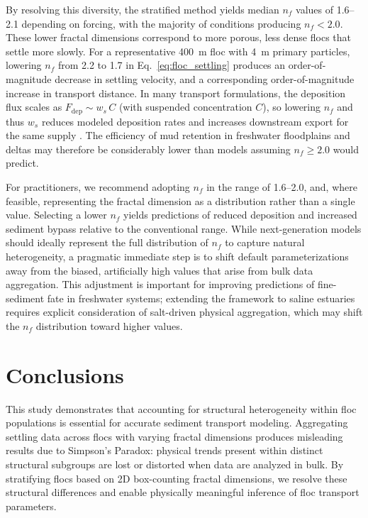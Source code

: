 \documentclass{agujournal2019}
\begin{document}
By resolving this diversity, the stratified method yields median $n_f$ values of 1.6--2.1 depending on forcing, with the majority of conditions producing $n_f < 2.0$. These lower fractal dimensions correspond to more porous, less dense flocs that settle more slowly. For a representative 400~\textmu m floc with 4~\textmu m primary particles, lowering $n_f$ from 2.2 to 1.7 in Eq.~\eqref{eq:floc_settling} produces an order-of-magnitude decrease in settling velocity, and a corresponding order-of-magnitude increase in transport distance. In many transport formulations, the deposition flux scales as $F_{\mathrm{dep}} \sim w_s\,C$ (with suspended concentration $C$), so lowering $n_f$ and thus $w_s$ reduces modeled deposition rates and increases downstream export for the same supply \cite{amoudry2008review}. The efficiency of mud retention in freshwater floodplains and deltas may therefore be considerably lower than models assuming $n_f \geq 2.0$ would predict.

For practitioners, we recommend adopting $n_f$ in the range of 1.6--2.0, and, where feasible, representing the fractal dimension as a distribution rather than a single value. Selecting a lower $n_f$ yields predictions of reduced deposition and increased sediment bypass relative to the conventional range. While next-generation models should ideally represent the full distribution of $n_f$ to capture natural heterogeneity, a pragmatic immediate step is to shift default parameterizations away from the biased, artificially high values that arise from bulk data aggregation. This adjustment is important for improving predictions of fine-sediment fate in freshwater systems; extending the framework to saline estuaries requires explicit consideration of salt-driven physical aggregation, which may shift the $n_f$ distribution toward higher values.

\section{Conclusions}

This study demonstrates that accounting for structural heterogeneity within floc populations is essential for accurate sediment transport modeling. Aggregating settling data across flocs with varying fractal dimensions produces misleading results due to Simpson's Paradox: physical trends present within distinct structural subgroups are lost or distorted when data are analyzed in bulk. By stratifying flocs based on 2D box-counting fractal dimensions, we resolve these structural differences and enable physically meaningful inference of floc transport parameters.
\end{document}
